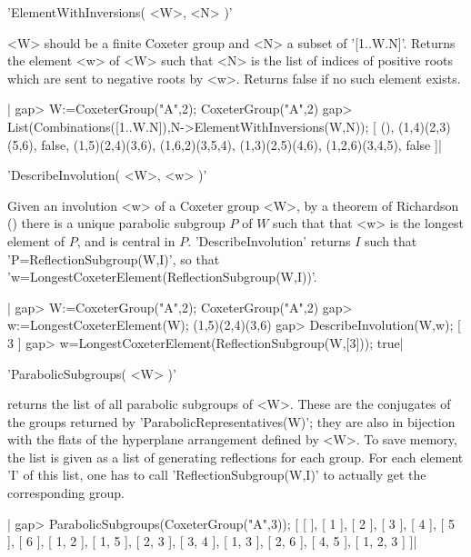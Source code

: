 
'ElementWithInversions( <W>, <N> )'

<W>  should  be  a  finite  Coxeter  group  and <N> a subset of '[1..W.N]'.
Returns  the element  <w> of  <W> such  that <N>  is the  list of indices of
positive roots which are sent to negative roots by <w>. Returns false if no
such element exists.

|    gap> W:=CoxeterGroup("A",2);
    CoxeterGroup("A",2)
    gap> List(Combinations([1..W.N]),N->ElementWithInversions(W,N));
    [ (), (1,4)(2,3)(5,6), false, (1,5)(2,4)(3,6), (1,6,2)(3,5,4), 
      (1,3)(2,5)(4,6), (1,2,6)(3,4,5), false ]|


'DescribeInvolution( <W>, <w> )'

Given  an involution <w> of a Coxeter group <W>, by a theorem of Richardson
(\cite{rich82})  there is a unique parabolic  subgroup $P$ of $W$ such that
that   <w>  is  the  longest  element  of  $P$,  and  is  central  in  $P$.
'DescribeInvolution'  returns $I$ such that 'P=ReflectionSubgroup(W,I)', so
that 'w=LongestCoxeterElement(ReflectionSubgroup(W,I))'.

|    gap> W:=CoxeterGroup("A",2);
    CoxeterGroup("A",2)
    gap> w:=LongestCoxeterElement(W);
    (1,5)(2,4)(3,6)
    gap> DescribeInvolution(W,w);
    [ 3 ]
    gap> w=LongestCoxeterElement(ReflectionSubgroup(W,[3]));
    true|


'ParabolicSubgroups( <W> )'

returns  the  list  of  all  parabolic  subgroups  of  <W>.  These  are the
conjugates  of the  groups returned  by 'ParabolicRepresentatives(W)'; they
are  also in bijection with the flats of the hyperplane arrangement defined
by  <W>.  To  save  memory,  the  list  is  given  as  a list of generating
reflections  for each group. For each element  'I' of this list, one has to
call 'ReflectionSubgroup(W,I)' to actually get the corresponding group.

|    gap> ParabolicSubgroups(CoxeterGroup("A",3));
    [ [  ], [ 1 ], [ 2 ], [ 3 ], [ 4 ], [ 5 ], [ 6 ], [ 1, 2 ], [ 1, 5 ], 
      [ 2, 3 ], [ 3, 4 ], [ 1, 3 ], [ 2, 6 ], [ 4, 5 ], [ 1, 2, 3 ] ]|

